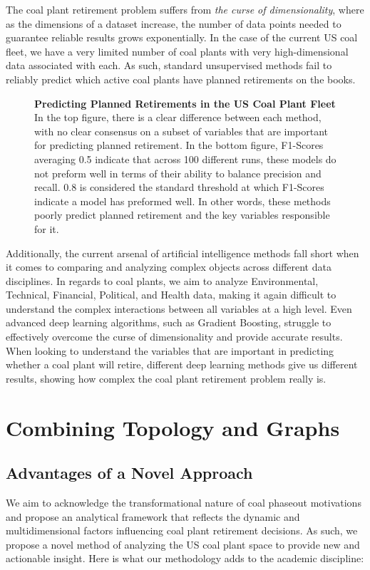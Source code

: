 \documentclass{article}
\begin{document}
The coal plant retirement problem suffers from \textit{the curse of dimensionality}, where as the dimensions of a dataset increase, the number of data points needed to guarantee reliable results grows exponentially. In the case of the current US coal fleet, we have a very limited number of coal plants with very high-dimensional data associated with each. As such, standard unsupervised methods fail to reliably predict which active coal plants have planned retirements on the books.

\begin{figure}[H]
    
    
    \label{fig:2}
    \caption{\textbf{Predicting Planned Retirements in the US Coal Plant Fleet} In the top figure, there is a clear difference between each method, with no clear consensus on a subset of variables that are important for predicting planned retirement. In the bottom figure, F1-Scores averaging 0.5 indicate that across 100 different runs, these models do not preform well in terms of their ability to balance precision and recall. 0.8 is considered the standard threshold at which F1-Scores indicate a model has preformed well. In other words, these methods poorly predict planned retirement and the key variables responsible for it.}
\end{figure}

Additionally, the current arsenal of artificial intelligence methods fall short when it comes to comparing and analyzing complex objects across different data disciplines. In regards to coal plants, we aim to analyze Environmental, Technical, Financial, Political, and Health data, making it again difficult to understand the complex interactions between all variables at a high level. Even advanced deep learning algorithms, such as Gradient Boosting, struggle to effectively overcome the curse of dimensionality and provide accurate results. When looking to understand the variables that are important in predicting whether a coal plant will retire, different deep learning methods give us different results, showing how complex the coal plant retirement problem really is.

\section{Combining Topology and Graphs}
\subsection{Advantages of a Novel Approach}
We aim to acknowledge the transformational nature of coal phaseout motivations and propose an analytical framework that reflects the dynamic and multidimensional factors influencing coal plant retirement decisions. As such, we propose a novel method of analyzing the US coal plant space to provide new and actionable insight. Here is what our methodology adds to the academic discipline:
\end{document}
